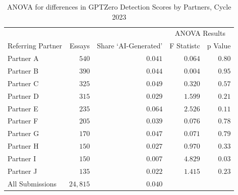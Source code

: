 \begin{table}[tbh]
    \centering
    \caption{ANOVA for differences in GPTZero Detection Scores by Partners, Cycle 2023 }
    \label{tab:c3_partner_anova}
    \begin{tabular}{ l r r r r }
        \toprule
        \multicolumn{3}{c}{} & \multicolumn{2}{c}{ANOVA Results} \\
        \cmidrule(lr){4-5}
        Referring Partner & Essays & Share `AI-Generated' & F Statistc & p Value \\
        \midrule
        Partner A & $540$ & $0.041$ & $0.064$ & $0.80$ \\
        Partner B & $390$ & $0.044$ & $0.004$ & $0.95$ \\
        Partner C & $325$ & $0.049$ & $0.320$ & $0.57$ \\
        Partner D & $315$ & $0.029$ & $1.599$ & $0.21$ \\
        Partner E & $235$ & $0.064$ & $2.526$ & $0.11$ \\
        Partner F & $205$ & $0.039$ & $0.076$ & $0.78$ \\
        Partner G & $170$ & $0.047$ & $0.071$ & $0.79$ \\
        Partner H & $150$ & $0.027$ & $0.970$ & $0.33$ \\
        Partner I & $150$ & $0.007$ & $4.829$ & $0.03$ \\
        Partner J & $135$ & $0.022$ & $1.415$ & $0.23$ \\%
        \midrule
        All Submissions & $24,815$ & $0.040$ & \\
        \bottomrule
    \end{tabular}
\end{table}

